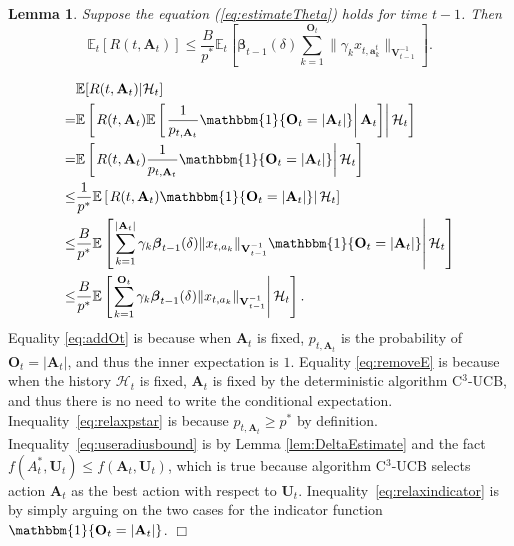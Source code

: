\documentclass{article}
\newcommand{\bbeta}{\boldsymbol{\beta}}
\newcommand{\EE}{\mathbb{E}}
\newcommand{\bOne}{\mathbbm{1}}
\newcommand{\bA}{\mathbf{A}}
\newcommand{\ba}{\mathbf{a}}
\newcommand{\bO}{\mathbf{O}}
\newcommand{\bU}{\mathbf{U}}
\newcommand{\bV}{\mathbf{V}}
\newcommand{\cH}{\mathcal{H}}
\newcommand{\abs}[1]{\left| #1 \right|}
\newcommand{\norm}[1]{\| #1 \|}
\newtheorem{lemma}[theorem]{Lemma}%
\newenvironment{proof}{\noindent {\textbf{Proof. }}}{$\Box$ \medskip}
\begin{document}
\begin{lemma} %
	\label{lem:DeltaEsimateWithP*}
	Suppose the equation (\ref{eq:estimateTheta}) holds for time $t-1$. Then
	$$
	\EE_t[R(t, \bA_t)] \leq \frac{B}{p^*} \EE_t \left[ \bbeta_{t-1}(\delta) \sum_{k=1}^{\bO_t}\norm{\gamma_k x_{t,\ba_k^t}}_{\bV_{t-1}^{-1}} \right].
	$$
\end{lemma}
\begin{proof}
	\begin{align}
		&\EE[R(t, \bA_t)|\cH_t]  \nonumber \\
		=& \EE \left[ \left. R(t, \bA_t) \EE \left[ \left. \frac{1}{p_{t, \bA_t}} \bOne\{\bO_t = \abs{\bA_t}\} \right| \bA_t \right]  \right| \cH_t \right] \label{eq:addOt}\\
		=& \EE \left[ \left. R(t, \bA_t) \frac{1}{p_{t, \bA_t}} \bOne\{\bO_t = \abs{\bA_t}\}  \right| \cH_t \right] \label{eq:removeE}\\
		\leq &\frac{1}{p^{\ast}} \EE \left[ \left. R(t, \bA_t) \bOne\{\bO_t = \abs{\bA_t}\}  \right| \cH_t \right] \label{eq:relaxpstar}\\
		\leq &\frac{B}{p^{\ast}} \EE \left[ \left. \sum_{k=1}^{\abs{\bA_t}} \gamma_k \bbeta_{t-1}(\delta)\norm{x_{t,a_k}}_{\bV_{t-1}^{-1}} \bOne\{\bO_t = \abs{\bA_t}\}  \right| \cH_t \right] \label{eq:useradiusbound}\\
		\leq &\frac{B}{p^{\ast}} \EE \left[ \left. \sum_{k=1}^{\bO_t} \gamma_k \bbeta_{t-1}(\delta)\norm{x_{t,a_k}}_{\bV_{t-1}^{-1}} \right| \cH_t \right]. \label{eq:relaxindicator}
	\end{align}
	Equality \eqref{eq:addOt} is because when $\bA_t$ is fixed, $p_{t, \bA_t}$ is the probability of $\bO_t = \abs{\bA_t}$, and thus the inner expectation is $1$. Equality \eqref{eq:removeE} is because when the history $\cH_t$ is fixed, $\bA_t$ is fixed by the deterministic algorithm C$^3$-UCB, and thus there is no need to write the conditional expectation. Inequality~\eqref{eq:relaxpstar} is because $p_{t,\bA_t} \geq p^*$ by definition. Inequality~\eqref{eq:useradiusbound} is by Lemma \ref{lem:DeltaEstimate} and the fact $f(A_t^*, \bU_t) \leq f(\bA_t, \bU_t)$, which is true because algorithm C$^3$-UCB selects action $\bA_t$ as the best action with respect to $\bU_t$. Inequality~\eqref{eq:relaxindicator} is by simply arguing on the two cases for the indicator function $\bOne\{\bO_t = \abs{\bA_t}\}$.
\end{proof}
\end{document}
